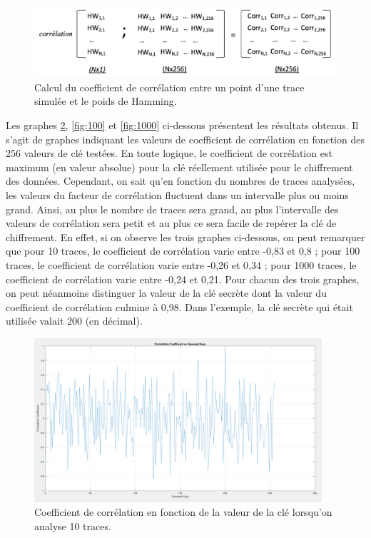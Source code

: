 \documentclass[10pt, oneside, a4paper]{article}
\begin{document}
\begin{figure}[htbp]
    \centering
    \includegraphics[scale=0.35]{image/CorrEx1}
    \caption{Calcul du coefficient de corrélation entre un point d'une trace simulée et le poids de Hamming.}
    \label{fig:CorrEx1} 
\end{figure}

\newpage
Les graphes \ref{fig:10}, \ref{fig:100} et \ref{fig:1000} ci-dessous présentent les résultats obtenus. Il s'agit de graphes indiquant les valeurs de coefficient de corrélation en fonction des 256 valeurs de clé testées. En toute logique, le coefficient de corrélation est maximum (en valeur absolue) pour la clé réellement utilisée pour le chiffrement des données. Cependant, on sait qu'en fonction du nombres de traces analysées, les valeurs du facteur de corrélation fluctuent dans un intervalle plus ou moins grand. Ainsi, au plus le nombre de traces sera grand, au plus l'intervalle des valeurs de corrélation sera petit et au plus ce sera facile de repérer la clé de chiffrement. En effet, si on observe les trois graphes ci-dessous, on peut remarquer que pour 10 traces, le coefficient de corrélation varie entre -0,83 et 0,8 ; pour 100 traces, le coefficient de corrélation varie entre -0,26 et 0,34 ; pour 1000 traces, le coefficient de corrélation varie entre -0,24 et 0,21. Pour chacun des trois graphes, on peut néanmoins distinguer la valeur de la clé secrète dont la valeur du coefficient de corrélation culmine à 0,98. Dans l'exemple, la clé secrète qui était utilisée valait 200 (en décimal).

\begin{figure}[htbp]
    \centering
    \includegraphics[width=0.95\textwidth]{image/10}    \caption{Coefficient de corrélation en fonction de la valeur de la clé lorsqu'on analyse 10 traces.}    \label{fig:10}
\end{figure}
\end{document}
